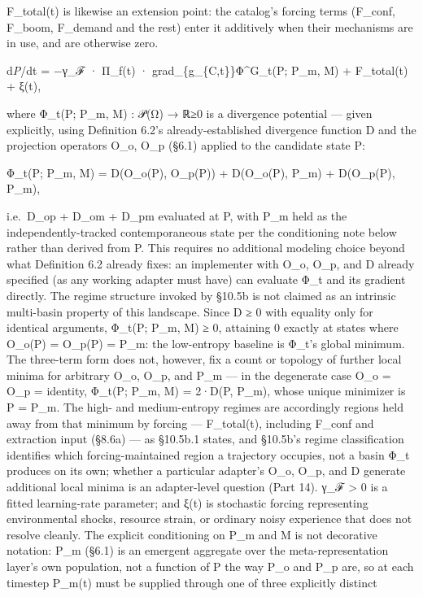 \documentclass[
]{article}
\begin{document}
F\_total(t) is likewise an extension point: the catalog's forcing terms
(F\_conf, F\_boom, F\_demand and the rest) enter it additively when
their mechanisms are in use, and are otherwise zero.

d\emph{P}/dt = −γ\_ℱ · Π\_f(t) · grad\_\{g\_\{C,t\}\}Φ\^{}G\_t(P; P\_m,
M) + F\_total(t) + ξ(t),

where Φ\_t(P; P\_m, M) : 𝒫(Ω) → ℝ≥0 is a divergence potential --- given
explicitly, using Definition 6.2's already-established divergence
function D and the projection operators O\_o, O\_p (§6.1) applied to the
candidate state P:

Φ\_t(P; P\_m, M) = D(O\_o(P), O\_p(P)) + D(O\_o(P), P\_m) + D(O\_p(P),
P\_m),

i.e.~D\_op + D\_om + D\_pm evaluated at P, with P\_m held as the
independently-tracked contemporaneous state per the conditioning note
below rather than derived from P. This requires no additional modeling
choice beyond what Definition 6.2 already fixes: an implementer with
O\_o, O\_p, and D already specified (as any working adapter must have)
can evaluate Φ\_t and its gradient directly. The regime structure
invoked by §10.5b is not claimed as an intrinsic multi-basin property of
this landscape. Since D ≥ 0 with equality only for identical arguments,
Φ\_t(P; P\_m, M) ≥ 0, attaining 0 exactly at states where O\_o(P) =
O\_p(P) = P\_m: the low-entropy baseline is Φ\_t's global minimum. The
three-term form does not, however, fix a count or topology of further
local minima for arbitrary O\_o, O\_p, and P\_m --- in the degenerate
case O\_o = O\_p = identity, Φ\_t(P; P\_m, M) = 2·D(P, P\_m), whose
unique minimizer is P = P\_m. The high- and medium-entropy regimes are
accordingly regions held away from that minimum by forcing ---
F\_total(t), including F\_conf and extraction input (§8.6a) --- as
§10.5b.1 states, and §10.5b's regime classification identifies which
forcing-maintained region a trajectory occupies, not a basin Φ\_t
produces on its own; whether a particular adapter's O\_o, O\_p, and D
generate additional local minima is an adapter-level question (Part 14).
γ\_ℱ \textgreater{} 0 is a fitted learning-rate parameter; and ξ(t) is
stochastic forcing representing environmental shocks, resource strain,
or ordinary noisy experience that does not resolve cleanly. The explicit
conditioning on P\_m and M is not decorative notation: P\_m (§6.1) is an
emergent aggregate over the meta-representation layer's own population,
not a function of P the way P\_o and P\_p are, so at each timestep
P\_m(t) must be supplied through one of three explicitly distinct
\end{document}
